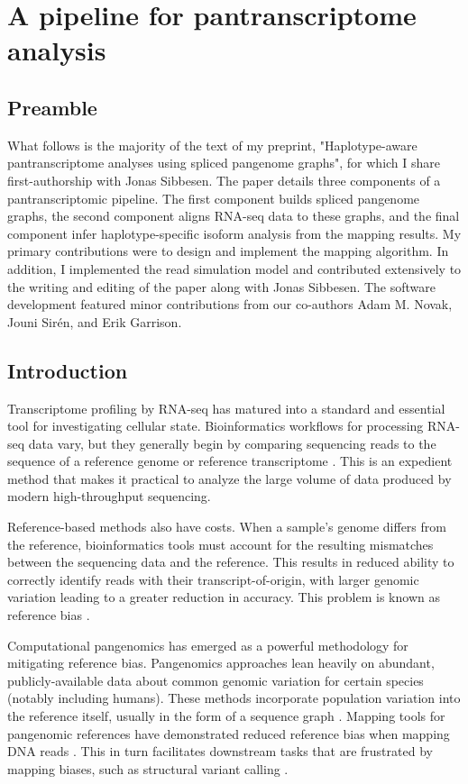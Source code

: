 \documentclass[11pt]{ucthesis}
\begin{document}
\chapter{A pipeline for pantranscriptome analysis}
\label{chapter:mpmap}

\section{Preamble}

What follows is the majority of the text of my preprint, "Haplotype-aware pantranscriptome analyses using spliced pangenome graphs", for which I share first-authorship with Jonas Sibbesen. The paper details three components of a pantranscriptomic pipeline. The first component builds spliced pangenome graphs, the second component aligns RNA-seq data to these graphs, and the final component infer haplotype-specific isoform analysis from the mapping results. My primary contributions were to design and implement the mapping algorithm. In addition, I implemented the read simulation model and contributed extensively to the writing and editing of the paper along with Jonas Sibbesen. The software development featured minor contributions from our co-authors Adam M. Novak, Jouni Sir\'{e}n, and Erik Garrison.

\section{Introduction}

Transcriptome profiling by RNA-seq has matured into a standard and essential tool for investigating cellular state. Bioinformatics workflows for processing RNA-seq data vary, but they generally begin by comparing sequencing reads to the sequence of a reference genome or reference transcriptome \cite{li2011rsem,dobin2013star,bray2016near,patro2017salmon}. This is an expedient method that makes it practical to analyze the large volume of data produced by modern high-throughput sequencing.

Reference-based methods also have costs. When a sample's genome differs from the reference, bioinformatics tools must account for the resulting mismatches between the sequencing data and the reference. This results in reduced ability to correctly identify reads with their transcript-of-origin, with larger genomic variation leading to a greater reduction in accuracy. This problem is known as reference bias \cite{stevenson2013sources}.

Computational pangenomics has emerged as a powerful methodology for mitigating reference bias. Pangenomics approaches lean heavily on abundant, publicly-available data about common genomic variation for certain species (notably including humans). These methods incorporate population variation into the reference itself, usually in the form of a sequence graph \cite{computational2018computational,eizenga2020pangenome}. Mapping tools for pangenomic references have demonstrated reduced reference bias when mapping DNA reads \cite{garrison2018variation,rakocevic2019fast,chen2021reference}. This in turn facilitates downstream tasks that are frustrated by mapping biases, such as structural variant calling \cite{hickey2020genotyping,sibbesen2018accurate}.
\end{document}
